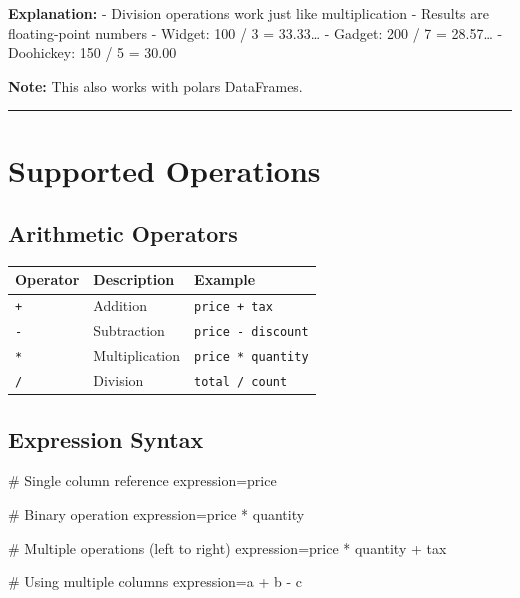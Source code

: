 \documentclass[
  letterpaper,
]{scrbook}
\newenvironment{Shaded}{\begin{snugshade}}{\end{snugshade}}
\newcommand{\CommentTok}[1]{\textcolor[rgb]{0.37,0.37,0.37}{#1}}
\newcommand{\NormalTok}[1]{\textcolor[rgb]{0.00,0.23,0.31}{#1}}
\newcommand{\OperatorTok}[1]{\textcolor[rgb]{0.37,0.37,0.37}{#1}}
\newcommand{\StringTok}[1]{\textcolor[rgb]{0.13,0.47,0.30}{#1}}
\begin{document}
\textbf{Explanation:} - Division operations work just like
multiplication - Results are floating-point numbers - Widget: 100 / 3 =
33.33\ldots{} - Gadget: 200 / 7 = 28.57\ldots{} - Doohickey: 150 / 5 =
30.00

\textbf{Note:} This also works with polars DataFrames.

\begin{center}\rule{0.5\linewidth}{0.5pt}\end{center}

\section{Supported Operations}\label{supported-operations}

\subsection{Arithmetic Operators}\label{arithmetic-operators}

\begin{longtable}[]{@{}lll@{}}
\toprule\noalign{}
Operator & Description & Example \\
\midrule\noalign{}
\endhead
\bottomrule\noalign{}
\endlastfoot
\texttt{+} & Addition & \texttt{price\ +\ tax} \\
\texttt{-} & Subtraction & \texttt{price\ -\ discount} \\
\texttt{*} & Multiplication & \texttt{price\ *\ quantity} \\
\texttt{/} & Division & \texttt{total\ /\ count} \\
\end{longtable}

\subsection{Expression Syntax}\label{expression-syntax}

\begin{Shaded}
\begin{Highlighting}[]
\CommentTok{\# Single column reference}
\NormalTok{expression}\OperatorTok{=}\StringTok{\textquotesingle{}price\textquotesingle{}}

\CommentTok{\# Binary operation}
\NormalTok{expression}\OperatorTok{=}\StringTok{\textquotesingle{}price * quantity\textquotesingle{}}

\CommentTok{\# Multiple operations (left to right)}
\NormalTok{expression}\OperatorTok{=}\StringTok{\textquotesingle{}price * quantity + tax\textquotesingle{}}

\CommentTok{\# Using multiple columns}
\NormalTok{expression}\OperatorTok{=}\StringTok{\textquotesingle{}a + b {-} c\textquotesingle{}}
\end{Highlighting}
\end{Shaded}
\end{document}
